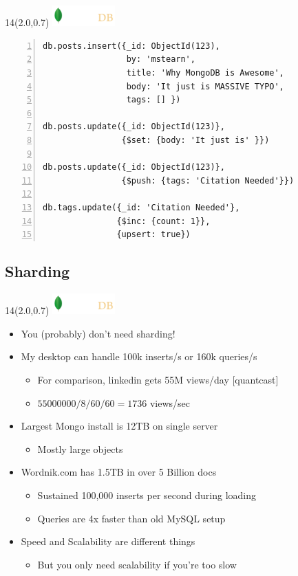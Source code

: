 \documentclass{beamer}
\newcommand{\MongoLogo}{
\begin{textblock}{14}(2.0,0.7)
  \includegraphics[height=0.8cm]{logo-mongodb-ondark.png}
\end{textblock}
}
\begin{document}
\begin{frame}[fragile]
  \MongoLogo

  \small
  \begin{lstlisting}[numbers=left, numberstyle=\tiny\color{red}]
db.posts.insert({_id: ObjectId(123),
                 by: 'mstearn',
                 title: 'Why MongoDB is Awesome',
                 body: 'It just is MASSIVE TYPO',
                 tags: [] })

db.posts.update({_id: ObjectId(123)},
                {$set: {body: 'It just is' }})

db.posts.update({_id: ObjectId(123)},
                {$push: {tags: 'Citation Needed'}})

db.tags.update({_id: 'Citation Needed'},
               {$inc: {count: 1}},
               {upsert: true})
  \end{lstlisting}
\end{frame}

\subsection{Sharding}
\begin{frame}[fragile]
  \MongoLogo
  \begin{itemize}
    \item You {\tiny (probably)} don't need sharding!

    \item My desktop can handle 100k inserts/s or 160k queries/s
      \begin{itemize}
        \item For comparison, linkedin gets 55M views/day [quantcast]
        \item $55000000 / 8 / 60 / 60 = 1736$ views/sec
      \end{itemize}

    \item Largest Mongo install is 12TB on single server
      \begin{itemize}
        \item Mostly large objects
      \end{itemize}

    \item Wordnik.com has 1.5TB in over 5 Billion docs
      \begin{itemize}
        \item Sustained 100,000 inserts per second during loading
        \item Queries are 4x faster than old MySQL setup
      \end{itemize}

    \item Speed and Scalability are different things
      \begin{itemize}
        \item But you only need scalability if you're too slow
      \end{itemize}

  \end{itemize}
\end{frame}
\end{document}
